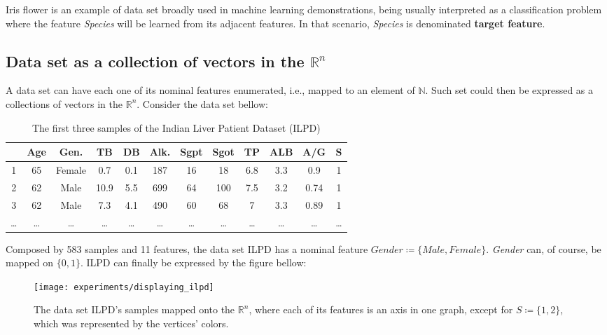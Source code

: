 
Iris flower is an example of data set broadly used in machine learning demonstrations, being usually interpreted as a classification problem where the feature {\em Species} will be learned from its adjacent features. In that scenario, {\em Species} is denominated \textbf{target feature}.

\subsection{Data set as a collection of vectors in the $\mathbb{R}^n$}

A data set can have each one of its nominal features enumerated, i.e., mapped to an element of $\mathbb{N}$. Such set could then be expressed as a collections of vectors in the $\mathbb{R}^n$. Consider the data set bellow:

\begin{table}[H]
	\begin{tabular}{ c | *{11}{|c}| }
		& \textbf{Age}
		& \textbf{Gen.}
		& \textbf{TB}
		& \textbf{DB}
		& \textbf{Alk.}
		& \textbf{Sgpt}
		& \textbf{Sgot}
		& \textbf{TP}
		& \textbf{ALB}
		& \textbf{A/G}
		& \textbf{S} \\
		 & 65 & Female & 0.7 & 0.1 & 187 & 16 & 18 & 6.8 & 3.3 & 0.9 & 1 \\
		2 & 62 & Male & 10.9 & 5.5 & 699 & 64 & 100 & 7.5 & 3.2 & 0.74 & 1 \\
		3 & 62 & Male & 7.3 & 4.1 & 490 & 60 & 68 & 7 & 3.3 & 0.89 & 1\\
		… & … & … & … & … & … & … & … & … & … & … & … \\
	\end{tabular}

	\caption{The first three samples of the Indian Liver Patient Dataset (ILPD) \protect\footnotemark}
\end{table}


Composed by 583 samples and 11 features, the data set ILPD has a nominal feature $Gender \coloneqq \{Male, Female\}$. {\em Gender} can, of course, be mapped on $\{0, 1\}$. ILPD can finally be expressed by the figure bellow:

\begin{figure}[H]
	\centering
	\captionsetup{justification=centering}

	\texttt{[image: experiments/displaying\_ilpd]}
	\caption{The data set ILPD's samples mapped onto the $\mathbb{R}^n$, where each of its features is an axis in one graph, except for $S \coloneqq \{1, 2\}$, which was represented by the vertices' colors.}
	\label{fig:disp_ilpd}
\end{figure}

